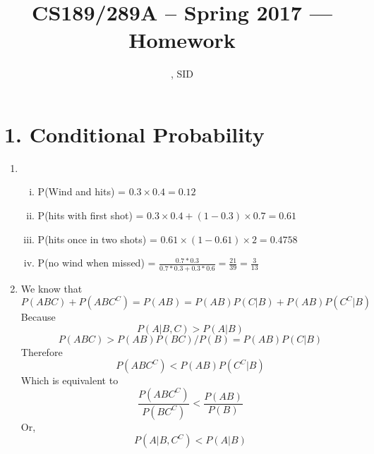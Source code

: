 \documentclass[11pt]{article}
\title{CS189/289A -- Spring 2017 --- Homework \Homework}
\author{\Name, SID \SID}
\date{}
\newenvironment{qparts}{\begin{enumerate}[{(}a{)}]}{\end{enumerate}}
\begin{document}
\maketitle


\section*{1. Conditional Probability}
\begin{qparts}
\item
\begin{enumerate}[i) ]
	\item P(Wind and hits) = $0.3\times 0.4 = 0.12$
	\item	P(hits with first shot) = $0.3\times 0.4 + (1-0.3) \times 0.7 = 0.61$
	\item P(hits once in two shots) = $0.61 \times (1-0.61) \times 2 = 0.4758$
	\item P(no wind when missed) = $\frac{0.7 * 0.3}{0.7*0.3 + 0.3 * 0.6} = \frac{21}{39} = \frac{3}{13}$
\end{enumerate}

\item
We know that 
$$P(ABC)+P(ABC^C) = P(AB) = P(AB)P(C|B)+P(AB)P(C^C|B)$$
Because 
$$P(A|B, C) > P(A|B)$$
$$P(ABC)>P(AB)P(BC)/P(B) = P(AB)P(C|B)$$
Therefore 
$$P(ABC^C) < P(AB)P(C^C|B)$$
Which is equivalent to 
$$\frac{P(ABC^C)}{P(BC^C)} < \frac{P(AB)}{P(B)}$$
Or,
$$P(A|B, C^C) < P(A|B)$$
\end{qparts}

\newpage
\end{document}
